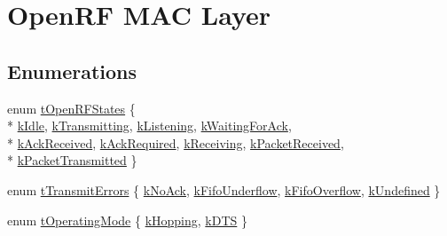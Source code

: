 \hypertarget{group___open_r_f}{\section{Open\-R\-F M\-A\-C Layer}
\label{group___open_r_f}
}
\subsection*{Enumerations}
\begin{DoxyCompactItemize}
\item 
enum \hyperlink{group___open_r_f_ga0191e76d54bb003723263a47fa9a7101}{t\-Open\-R\-F\-States} \{ \\*
\hyperlink{group___open_r_f_gga0191e76d54bb003723263a47fa9a7101a19d8199da79ca4c28eb644052b08f632}{k\-Idle}, 
\hyperlink{group___open_r_f_gga0191e76d54bb003723263a47fa9a7101aa20cbba7c3fbef0687f9aad998e94a0e}{k\-Transmitting}, 
\hyperlink{group___open_r_f_gga0191e76d54bb003723263a47fa9a7101ad6cfbd04bb1785e5347062ce124ec4dc}{k\-Listening}, 
\hyperlink{group___open_r_f_gga0191e76d54bb003723263a47fa9a7101add8280cdb1cba70addb16dee65ca02e6}{k\-Waiting\-For\-Ack}, 
\\*
\hyperlink{group___open_r_f_gga0191e76d54bb003723263a47fa9a7101af96c997a16573b1841aab376fa02c12b}{k\-Ack\-Received}, 
\hyperlink{group___open_r_f_gga0191e76d54bb003723263a47fa9a7101a2b19c68e5a1e48fcb1227d09382413de}{k\-Ack\-Required}, 
\hyperlink{group___open_r_f_gga0191e76d54bb003723263a47fa9a7101a6a5907d52deb390eec3e544e19e45b33}{k\-Receiving}, 
\hyperlink{group___open_r_f_gga0191e76d54bb003723263a47fa9a7101a9b1fddf44bce966b60624b8566da0f5e}{k\-Packet\-Received}, 
\\*
\hyperlink{group___open_r_f_gga0191e76d54bb003723263a47fa9a7101a1bec80a402b7a72ae776bf8631871643}{k\-Packet\-Transmitted}
 \}
\item 
enum \hyperlink{group___open_r_f_ga75b3ac4a450160131d80d0178b974101}{t\-Transmit\-Errors} \{ \hyperlink{group___open_r_f_gga75b3ac4a450160131d80d0178b974101a09c3a6fa88cf4c80c7516b2d657894a5}{k\-No\-Ack}, 
\hyperlink{group___open_r_f_gga75b3ac4a450160131d80d0178b974101af83ce339764c3382ff1436195925846d}{k\-Fifo\-Underflow}, 
\hyperlink{group___open_r_f_gga75b3ac4a450160131d80d0178b974101a02dea8a7ec5fd46f76769a41e827093b}{k\-Fifo\-Overflow}, 
\hyperlink{group___open_r_f_gga75b3ac4a450160131d80d0178b974101af2cd3231820315500697550960956126}{k\-Undefined}
 \}
\item 
enum \hyperlink{group___open_r_f_gafc8ed4739129ef185b07220c9406f531}{t\-Operating\-Mode} \{ \hyperlink{group___open_r_f_ggafc8ed4739129ef185b07220c9406f531aca42c074332be0f2a766afb361c34f00}{k\-Hopping}, 
\hyperlink{group___open_r_f_ggafc8ed4739129ef185b07220c9406f531a6ddd6b8071bdfdeacef32e59eed44e3a}{k\-D\-T\-S}
 \}
\end{DoxyCompactItemize}
